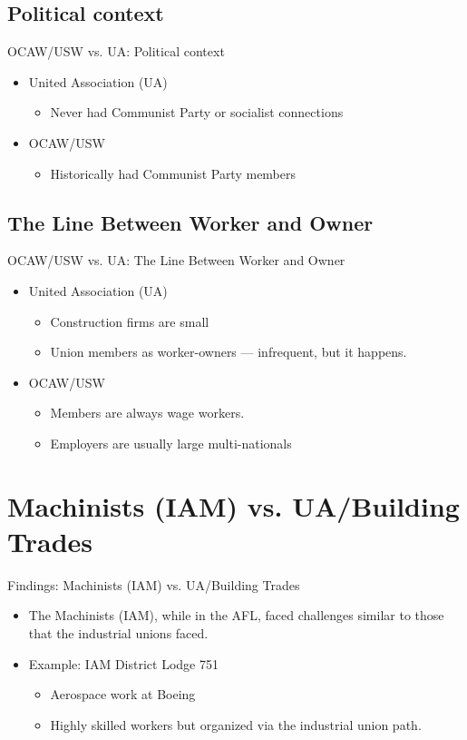 \documentclass{beamer}
\begin{document}
\subsection{Political context}
\begin{frame}{OCAW/USW vs. UA: Political context}
	\begin{itemize}
		\item United Association (UA)
		\begin{itemize}
			\item Never had Communist Party or socialist connections
		\end{itemize}
		\item OCAW/USW
			\begin{itemize}
				\item Historically had Communist Party members
			\end{itemize}
	\end{itemize}
\end{frame}

\subsection{The Line Between Worker and Owner}
\begin{frame}{OCAW/USW vs. UA: The Line Between Worker and Owner}
	\begin{itemize}
		\item United Association (UA)
		\begin{itemize}
			\item Construction firms are small
			\item Union members as worker-owners — infrequent, but it happens.
		\end{itemize}
		\item OCAW/USW
			\begin{itemize}
				\item Members are always wage workers.
				\item Employers are usually large multi-nationals
			\end{itemize}
	\end{itemize}
\end{frame}


\section{Machinists (IAM) vs. UA/Building Trades}
\begin{frame}{Findings: Machinists (IAM) vs. UA/Building Trades}
	\begin{itemize}
		\item The Machinists (IAM), while in the AFL, faced challenges similar to those that the industrial unions faced.
		\item Example: IAM District Lodge 751
		\begin{itemize}
			\item Aerospace work at Boeing
			\item Highly skilled workers but organized via the industrial union path.
		\end{itemize}
	\end{itemize}
\end{frame}
\end{document}
